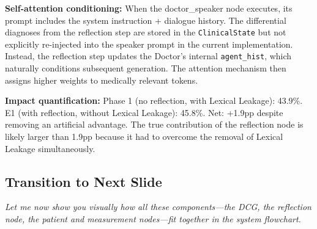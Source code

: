 \documentclass[12pt]{article}
\begin{document}
{  \textbf{Self-attention conditioning:} When the doctor\_speaker node executes, its prompt includes the system instruction + dialogue history. The differential diagnoses from the reflection step are stored in the \texttt{ClinicalState} but not explicitly re-injected into the speaker prompt in the current implementation. Instead, the reflection step updates the Doctor's internal \texttt{agent\_hist}, which naturally conditions subsequent generation. The attention mechanism then assigns higher weights to medically relevant tokens.

  \textbf{Impact quantification:} Phase 1 (no reflection, with Lexical Leakage): 43.9\%. E1 (with reflection, without Lexical Leakage): 45.8\%. Net: +1.9pp despite removing an artificial advantage. The true contribution of the reflection node is likely larger than 1.9pp because it had to overcome the removal of Lexical Leakage simultaneously.
  }

  \subsection*{Transition to Next Slide}
  {\color{transgreen}
  \textit{Let me now show you visually how all these components---the DCG, the reflection node, the patient and measurement nodes---fit together in the system flowchart.}
  }
\end{document}
